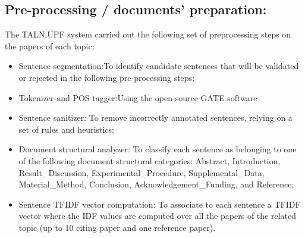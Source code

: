 \documentclass[11pt]{article}
\begin{document}
\subsection{Pre-processing / documents’ preparation:}
The TALN.UPF system carried out the following set of preprocessing steps on the 
papers of each topic:
\begin{itemize}
\item{Sentence segmentation:}To identify candidate sentences that will be 
validated or rejected in the following pre-processing steps;
\item{Tokenizer and POS tagger:}Using the open-source GATE software
\item{Sentence sanitizer:} To remove incorrectly annotated sentences, 
relying on a set of rules and heuristics;
\item{Document structural analyzer:} To classify each sentence as belonging 
to one of the following document structural categories: Abstract, 
Introduction, Result\_Discussion, Experimental\_Procedure, 
Supplemental\_Data, Material\_Method, Conclusion, Acknowledgement\_Funding, 
and Reference;
\item{Sentence TFIDF vector computation:} To associate to each sentence a 
TFIDF vector where the IDF values are computed over all the papers of the 
related topic (up to 10 citing paper and one reference paper).
\end{itemize}
\end{document}
